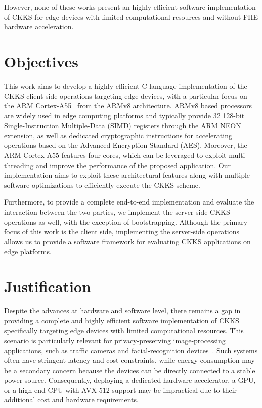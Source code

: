 However, none of these works present an highly efficient software implementation of CKKS for edge devices with limited computational resources and without FHE hardware acceleration.

\section{Objectives}

This work aims to develop a highly efficient C-language implementation of the CKKS client-side operations targeting edge devices, with a particular focus on the ARM Cortex-A55~\cite{arm2023cortexa55} from the ARMv8 architecture. ARMv8 based processors are widely used in edge computing platforms and typically provide 32 128-bit Single-Instruction Multiple-Data (SIMD) registers through the ARM NEON extension, as well as dedicated cryptographic instructions for accelerating operations based on the Advanced Encryption Standard (AES). Moreover, the ARM Cortex-A55 features four cores, which can be leveraged to exploit multi-threading and improve the performance of the proposed application. Our implementation aims to exploit these architectural features along with multiple software optimizations to efficiently execute the CKKS scheme.

Furthermore, to provide a complete end-to-end implementation and evaluate the interaction between the two parties, we implement the server-side CKKS operations as well, with the exception of bootstrapping. Although the primary focus of this work is the client side, implementing the server-side operations allows us to provide a software framework for evaluating CKKS applications on edge platforms.

\section{Justification}

Despite the advances at hardware and software level, there remains a gap in providing a complete and highly efficient software implementation of CKKS specifically targeting edge devices with limited computational resources. This scenario is particularly relevant for privacy-preserving image-processing applications, such as traffic cameras and facial-recognition devices~\cite{martin2025hydia}. Such systems often have stringent latency and cost constraints, while energy consumption may be a secondary concern because the devices can be directly connected to a stable power source. Consequently, deploying a dedicated hardware accelerator, a GPU, or a high-end CPU with AVX-512 support may be impractical due to their additional cost and hardware requirements.

